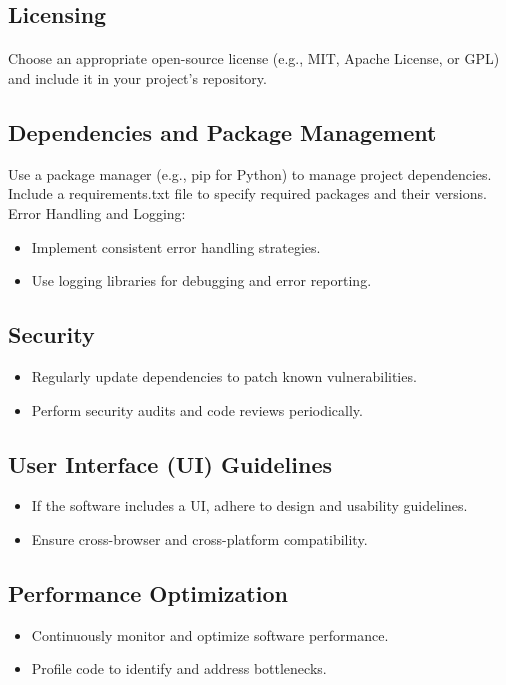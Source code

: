 \documentclass{article}
\begin{document}
\subsection{Licensing}
\paragraph{}
Choose an appropriate open-source license (e.g., MIT, Apache License, or GPL) and
include it in your project's repository.

\subsection{Dependencies and Package Management}
Use a package manager (e.g., pip for Python) to manage project dependencies.
Include a requirements.txt file to specify required packages and their versions.
Error Handling and Logging:
\begin{itemize}
    \item Implement consistent error handling strategies.
    \item Use logging libraries for debugging and error reporting.
\end{itemize}

\subsection{Security}
\begin{itemize}
    \item Regularly update dependencies to patch known vulnerabilities.
    \item Perform security audits and code reviews periodically.
\end{itemize}

\subsection{User Interface (UI) Guidelines}
\begin{itemize}
    \item If the software includes a UI, adhere to design and usability guidelines.
    \item Ensure cross-browser and cross-platform compatibility.
\end{itemize}

\subsection{Performance Optimization}
\begin{itemize}
    \item Continuously monitor and optimize software performance.
    \item Profile code to identify and address bottlenecks.
\end{itemize}
\end{document}
